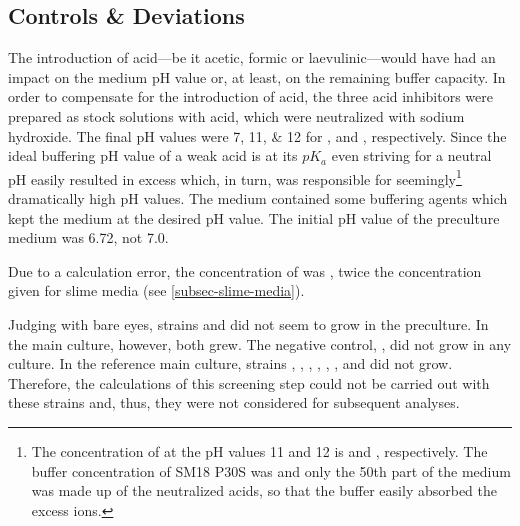\subsection{Controls \& Deviations}
The introduction of  acid---be it acetic, formic or laevulinic---would have had an impact on the medium pH value or, at least, on the remaining buffer capacity. In order to compensate for the introduction of acid, the three acid inhibitors were prepared as stock solutions with  acid, which were neutralized with  sodium hydroxide. The final pH values were \numlist{7;11;12} for \acet{}, \fora{} and \laev{}, respectively. Since the ideal buffering pH value of a weak acid is at its $pK_a$ even striving for a neutral pH easily resulted in excess  which, in turn, was responsible for seemingly\footnote{The concentration of  at the pH values 11 and 12 is  and , respectively. The buffer concentration of SM18 P30S was  and only the 50th part of the medium was made up of the neutralized acids, so that the buffer easily absorbed the excess  ions.} dramatically high pH values. The medium contained some buffering agents which kept the medium at the desired pH value. The initial pH value of the preculture medium was \num{6.72}, not \num{7.0}.

Due to a calculation error, the concentration of  was , twice the concentration given for slime media (see \vref{subsec-slime-media}).

Judging with bare eyes, strains  and  did not seem to grow in the preculture. In the main culture, however, both grew. The negative control, , did not grow in any culture. In the reference main culture, strains , , , , , ,  and  did not grow. Therefore, the calculations of this screening step could not be carried out with these strains and, thus, they were not considered for subsequent analyses.


